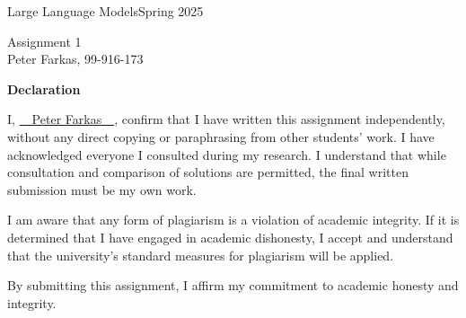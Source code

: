 \documentclass[a4paper,12pt]{ETHexercise}
\begin{document}
{\Large Large Language Models}{Spring 2025}

\vspace{5mm}
\begin{center}
    {\Huge Assignment 1 \\ \vspace{5mm} \Large Peter Farkas, 99-916-173}\\
\end{center}

\vspace{3cm}

\begin{center}
    {\large \textbf{Declaration}}
\end{center}

I, \textcolor{ETHGreen}{{\cursive\setul{0.1ex}{}\ul{~~Peter Farkas~~}}}, confirm that I have written this assignment independently, without any direct copying or paraphrasing from other students' work. 
I have acknowledged everyone I consulted during my research. 
I understand that while consultation and comparison of solutions are permitted, the final written submission must be my own work.

I am aware that any form of plagiarism is a violation of academic integrity. If it is determined that I have engaged in academic dishonesty, I accept and understand that the university's standard measures for plagiarism will be applied.

By submitting this assignment, I affirm my commitment to academic honesty and integrity.

\newpage

%

%

%


\newpage
\end{document}
